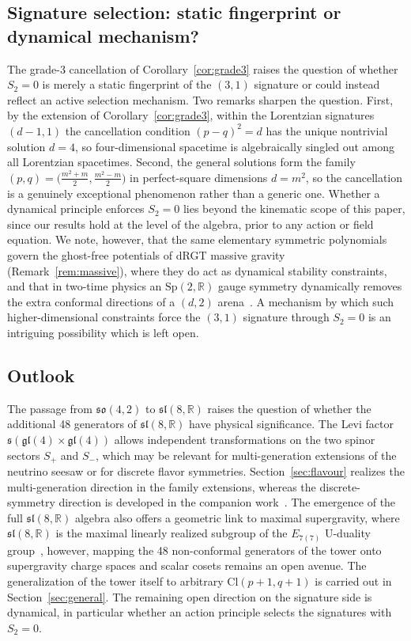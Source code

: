 \documentclass{birkjour}
\theoremstyle{definition}
\theoremstyle{remark}
\numberwithin{equation}{section}
\newcommand{\Cl}{\mathrm{Cl}}
\newcommand{\so}{\mathfrak{so}}
\newcommand{\slR}{\mathfrak{sl}}
\newcommand{\glR}{\mathfrak{gl}}
\newcommand{\R}{\mathbb{R}}
\providecommand{\rev}{{}}
\newenvironment{revblock}{}{}
\begin{document}
\subsection{Signature selection: static fingerprint or
dynamical mechanism?}

\begin{revblock}
The grade-3 cancellation of Corollary~\ref{cor:grade3}
raises the question of whether $S_2=0$ is merely a static
fingerprint of the $(3,1)$ signature or could instead
reflect an active selection mechanism. Two remarks sharpen
the question. First, by the extension of
Corollary~\ref{cor:grade3}, within the Lorentzian signatures
$(d-1,1)$ the cancellation condition $(p-q)^2=d$ has the
unique nontrivial solution $d=4$, so four-dimensional
spacetime is algebraically singled out among all Lorentzian
spacetimes. Second, the general solutions form the family
$(p,q)=\bigl(\tfrac{m^2+m}{2},\tfrac{m^2-m}{2}\bigr)$ in
perfect-square dimensions $d=m^2$, so the cancellation is a
genuinely exceptional phenomenon rather than a generic one.
Whether a dynamical principle enforces $S_2=0$ lies beyond
the kinematic scope of this paper, since our results hold at
the level of the algebra, prior to any action or field
equation. We note, however, that the same elementary
symmetric polynomials govern the ghost-free potentials of
dRGT massive gravity (Remark~\ref{rem:massive}), where they
do act as dynamical stability constraints, and that in
two-time physics an $\mathrm{Sp}(2,\R)$ gauge symmetry
dynamically removes the extra conformal directions of a
$(d,2)$ arena~\cite{Bars2001}. A mechanism by which such
higher-dimensional constraints force the $(3,1)$ signature
through $S_2=0$ is an intriguing possibility 
which is left open.
\end{revblock}

\subsection{Outlook}

The passage from $\so(4,2)$ to $\slR(8,\R)$ raises the
question of whether the additional 48 generators of
$\slR(8,\R)$ have physical significance.
The Levi factor
$\mathfrak{s}(\glR(4)\times\glR(4))$ allows independent
transformations on the two spinor sectors $S_+$ and $S_-$,
which may be relevant for multi-generation extensions
of the neutrino seesaw or for discrete flavor symmetries.
\rev{Section~\ref{sec:flavour} realizes the
multi-generation direction in the family extensions,
whereas the
discrete-symmetry direction is developed in the companion
work~\cite{HansenCPT2026}.}
The emergence of the full $\slR(8,\R)$ algebra also offers
a geometric link to maximal supergravity, where
$\slR(8,\R)$ is the maximal linearly realized subgroup of
the $E_{7(7)}$ U-duality group~\cite{cremmer},
however, mapping the
48 non-conformal generators of the tower onto supergravity
charge spaces and scalar cosets remains an open avenue.
\rev{The generalization of the tower itself to arbitrary
$\Cl(p+1,q+1)$ is carried out in
Section~\ref{sec:general}. The remaining open direction on
the signature side is dynamical, in particular
whether an action
principle selects the signatures with $S_2=0$.}
\end{document}
